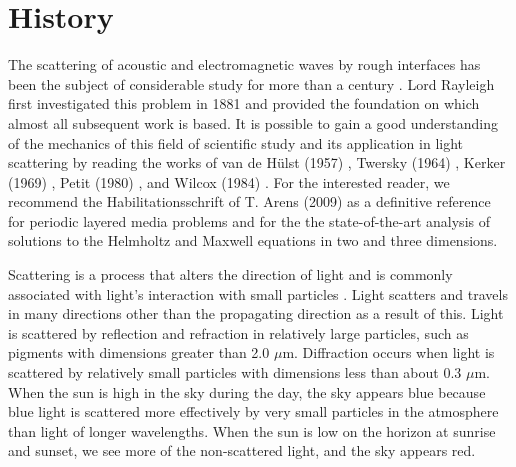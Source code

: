 \section{History}
\label{intro:history}
The scattering of acoustic and electromagnetic waves by rough interfaces has been the subject of considerable study for more than a century \cite{varadan2013low}. Lord Rayleigh first investigated this problem in 1881 \cite{rayleigh1881x} and provided the foundation on which almost all subsequent work is based. It is possible to gain a good understanding of the mechanics of this field of scientific study and its application in light scattering by reading the works of van de Hülst (1957) \cite{hulst1981light}, Twersky (1964) \cite{twersky1964rayleigh}, Kerker (1969) \cite{Kerker1969TheSO}, Petit (1980) \cite{Petit80}, and Wilcox (1984) \cite{Wilcox84}. For the interested reader, we recommend the Habilitationsschrift of T. Arens (2009) \cite{ArensHab} as a definitive reference for periodic layered media problems and for the the state-of-the-art analysis of solutions to the Helmholtz and Maxwell equations in two and three dimensions.

Scattering is a process that alters the direction of light and is commonly associated with light's interaction with small particles \cite{choudhury2014principles}. Light scatters and travels in many directions other than the propagating direction as a result of this. Light is scattered by reflection and refraction in relatively large particles, such as pigments with dimensions greater than 2.0 $\mu$m. Diffraction occurs when light is scattered by relatively small particles with dimensions less than about 0.3 $\mu$m. When the sun is high in the sky during the day, the sky appears blue because blue light is scattered more effectively by very small particles in the atmosphere than light of longer wavelengths. When the sun is low on the horizon at sunrise and sunset, we see more of the non-scattered light, and the sky appears red. 

